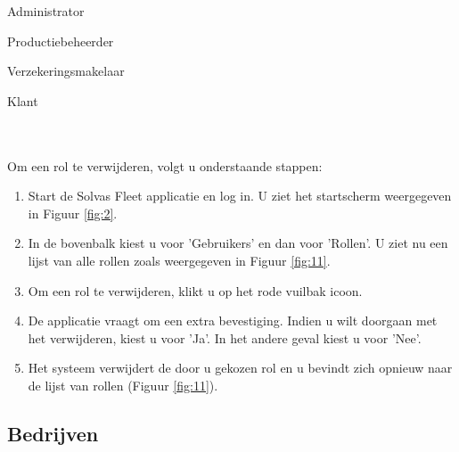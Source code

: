 \documentclass[11pt,openany]{article}
\newcommand{\cmark}{\ding{51}}%
\newcommand{\xmark}{\ding{55}}%
\newcommand{\done}{\rlap{$\square$}{\raisebox{2pt}{\large\hspace{1pt}\cmark}}%
	\hspace{-2.5pt}}
\newcommand{\wontfix}{\rlap{$\square$}{\large\hspace{1pt}\xmark}}
\begin{document}
\begin{todolist}
	\item[\done] Administrator
	\item[\wontfix] Productiebeheerder
	\item[\wontfix] Verzekeringsmakelaar
	\item[\wontfix] Klant 
\end{todolist}
\\
\\
Om een rol te verwijderen, volgt u onderstaande stappen:
\begin{enumerate}
	\item Start de Solvas Fleet applicatie en log in. U ziet het startscherm weergegeven in Figuur \ref{fig:2}.
	\item In de bovenbalk kiest u voor 'Gebruikers' en dan voor 'Rollen'. U ziet nu een lijst van alle rollen zoals weergegeven in Figuur \ref{fig:11}.
	\item Om een rol te verwijderen, klikt u op het rode vuilbak icoon. 
	\item De applicatie vraagt om een extra bevestiging. Indien u wilt doorgaan met het verwijderen, kiest u voor 'Ja'. In het andere geval kiest u voor 'Nee'.
	\item Het systeem verwijdert de door u gekozen rol en u bevindt zich opnieuw naar de lijst van rollen (Figuur \ref{fig:11}).
\end{enumerate}
\newpage
\subsection{Bedrijven}
\end{document}
